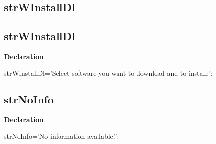 \documentclass{report}
\newif\ifpdf
\begin{document}
\subsection*{\large{\textbf{strWInstallDl}}\normalsize\hspace{1ex}\hrulefill}
\else
\subsection*{strWInstallDl}
\fi
\label{trstrings-strWInstallDl}
\begin{list}{}{
\setlength{\itemindent}{0cm}
\setlength{\listparindent}{0cm}
\setlength{\leftmargin}{\evensidemargin}
\addtolength{\leftmargin}{\tmplength}
\settowidth{\labelsep}{X}
\addtolength{\leftmargin}{\labelsep}
\setlength{\labelwidth}{\tmplength}
}
\item[\textbf{Declaration}\hfill]
\ifpdf
\begin{flushleft}
\fi
\begin{ttfamily}
strWInstallDl='Select software you want to download and to install:';\end{ttfamily}

\ifpdf
\end{flushleft}
\fi

\end{list}
\ifpdf
\subsection*{\large{\textbf{strNoInfo}}\normalsize\hspace{1ex}\hrulefill}
\else
\subsection*{strNoInfo}
\fi
\label{trstrings-strNoInfo}
\begin{list}{}{
\setlength{\itemindent}{0cm}
\setlength{\listparindent}{0cm}
\setlength{\leftmargin}{\evensidemargin}
\addtolength{\leftmargin}{\tmplength}
\settowidth{\labelsep}{X}
\addtolength{\leftmargin}{\labelsep}
\setlength{\labelwidth}{\tmplength}
}
\item[\textbf{Declaration}\hfill]
\ifpdf
\begin{flushleft}
\fi
\begin{ttfamily}
strNoInfo='No information available!';\end{ttfamily}

\ifpdf
\end{flushleft}
\fi

\end{list}
\ifpdf
\end{document}
